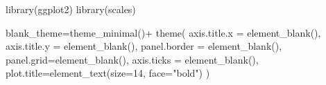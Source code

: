 \documentclass[
]{book}
\newenvironment{Shaded}{\begin{snugshade}}{\end{snugshade}}
\newcommand{\AttributeTok}[1]{\textcolor[rgb]{0.77,0.63,0.00}{#1}}
\newcommand{\DecValTok}[1]{\textcolor[rgb]{0.00,0.00,0.81}{#1}}
\newcommand{\FunctionTok}[1]{\textcolor[rgb]{0.00,0.00,0.00}{#1}}
\newcommand{\NormalTok}[1]{#1}
\newcommand{\OtherTok}[1]{\textcolor[rgb]{0.56,0.35,0.01}{#1}}
\newcommand{\SpecialCharTok}[1]{\textcolor[rgb]{0.00,0.00,0.00}{#1}}
\newcommand{\StringTok}[1]{\textcolor[rgb]{0.31,0.60,0.02}{#1}}
\begin{document}
\hfill\break

\begin{Shaded}
\begin{Highlighting}[]
\FunctionTok{library}\NormalTok{(ggplot2)}
\FunctionTok{library}\NormalTok{(scales)}

\NormalTok{blank\_theme}\OtherTok{=}\FunctionTok{theme\_minimal}\NormalTok{()}\SpecialCharTok{+}
  \FunctionTok{theme}\NormalTok{(}
    \AttributeTok{axis.title.x =} \FunctionTok{element\_blank}\NormalTok{(),}
    \AttributeTok{axis.title.y =} \FunctionTok{element\_blank}\NormalTok{(),}
    \AttributeTok{panel.border =} \FunctionTok{element\_blank}\NormalTok{(),}
    \AttributeTok{panel.grid=}\FunctionTok{element\_blank}\NormalTok{(),}
    \AttributeTok{axis.ticks =} \FunctionTok{element\_blank}\NormalTok{(),}
    \AttributeTok{plot.title=}\FunctionTok{element\_text}\NormalTok{(}\AttributeTok{size=}\DecValTok{14}\NormalTok{, }\AttributeTok{face=}\StringTok{"bold"}\NormalTok{)}
\NormalTok{  )}


\end{Highlighting}
\end{Shaded}
\end{document}
